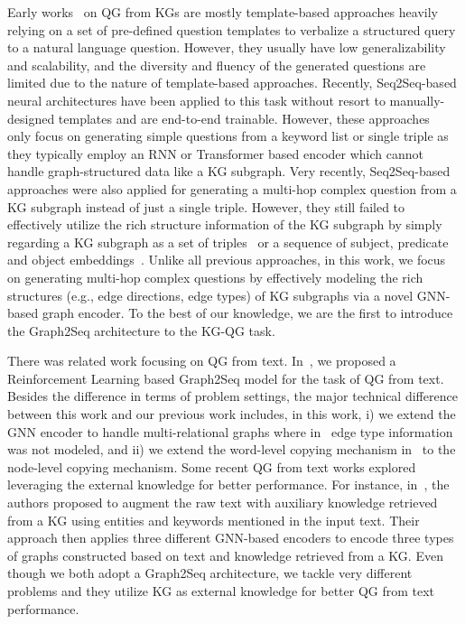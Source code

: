 \documentclass[journal]{IEEEtran}
\begin{document}
Early works~\cite{seyler2015generating,song2016question,seyler2017knowledge} on QG from KGs are mostly template-based approaches heavily relying on a set of pre-defined question templates to verbalize a structured query to a natural language question. However, they usually have low generalizability and scalability, and the diversity and fluency of the generated questions are limited due to the nature of template-based approaches.
Recently, Seq2Seq-based neural architectures have been applied to this task without resort to manually-designed templates and are end-to-end trainable.
However, these approaches~\cite{serban2016generating,reddy2017generating,elsahar2018zero,liu2019generating,hu2022generating} only focus on generating simple questions from a keyword list or single triple as they typically employ an RNN or Transformer based encoder which cannot handle graph-structured data like a KG subgraph.
Very recently, Seq2Seq-based approaches were also applied for generating a multi-hop complex question from a KG subgraph instead of just a single triple. However, they still failed to effectively utilize the rich structure information of the KG subgraph by simply regarding a KG subgraph as a set of triples~\cite{kumar2019difficulty} or a sequence of subject, predicate and object embeddings~\cite{sheng2020knowledge}.
Unlike all previous approaches, in this work, we focus on generating multi-hop complex questions by effectively modeling the rich structures (e.g., edge directions, edge types) of KG subgraphs via a novel GNN-based graph encoder. To the best of our knowledge, we are the first to introduce the Graph2Seq architecture to the KG-QG task. 




There was related work focusing on QG from text.
In~\cite{chen2019reinforcement}, we proposed a Reinforcement Learning based Graph2Seq model for the task of QG from text. Besides the difference in terms of problem settings, the major technical difference between this work and our previous work includes, in this work, i) we extend the GNN encoder to handle multi-relational graphs where in~\cite{chen2019reinforcement} edge type information was not modeled, and ii) we extend the word-level copying mechanism in~\cite{chen2019reinforcement} to the node-level copying mechanism.
Some recent QG from text works explored leveraging the external knowledge for better performance. For instance, in~\cite{shen2022diversified}, the authors proposed to augment the raw text with auxiliary knowledge retrieved from a KG using entities and keywords mentioned in the input text. Their approach then applies three different GNN-based encoders to encode three types of graphs constructed based on text and knowledge retrieved from a KG. Even though we both adopt a Graph2Seq architecture, we tackle very different problems and they utilize KG as external knowledge for better QG from text performance.
\end{document}
